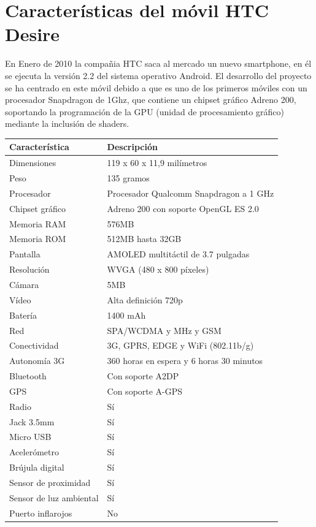 \section*{Características del móvil HTC Desire}
En Enero de 2010 la compañia HTC saca al mercado un nuevo smartphone, en él se ejecuta la versión 2.2 del sistema operativo Android. El desarrollo del proyecto se ha centrado en este móvil debido a que es uno de los primeros móviles con un procesador Snapdragon de 1Ghz, que contiene un chipset gráfico Adreno 200, soportando la programación de la GPU (unidad de procesamiento gráfico) mediante la inclusión de shaders.
\newline 

\begin{center}
\begin{tabular}{|l|l|}
\hline
\rowcolor[gray]{.8}Característica & Descripción \\\hline
\hline
Dimensiones  			& 119 x 60 x 11,9 milímetros						\\\hline
Peso				 	& 135 gramos 								 	\\\hline
Procesador			& Procesador Qualcomm Snapdragon a 1 GHz			\\\hline
Chipset gráfico			& Adreno 200 con soporte OpenGL ES 2.0				\\\hline
Memoria RAM	 		& 576MB 										\\\hline
Memoria ROM  			& 512MB	hasta 32GB							\\\hline
Pantalla		 		& AMOLED multitáctil de 3.7 pulgadas					\\\hline
Resolución	 			& WVGA (480 x 800 píxeles)						\\\hline
Cámara			 	& 5MB										\\\hline
Vídeo				& Alta definición 720p								\\\hline
Batería			 	& 1400 mAh 									\\\hline
Red					& SPA/WCDMA y MHz y GSM						\\\hline
Conectividad			& 3G, GPRS, EDGE y WiFi (802.11b/g)					\\\hline
Autonomía	3G 			& 360 horas en espera y 6 horas 30 minutos  			\\\hline
Bluetooth				& Con soporte A2DP								\\\hline
GPS 					& Con soporte A-GPS								\\\hline
Radio				& Sí											\\\hline
Jack 3.5mm			& Sí											\\\hline
Micro USB				& Sí											\\\hline
Acelerómetro			& Sí											\\\hline
Brújula digital 			& Sí											\\\hline
Sensor de proximidad 	& Sí											\\\hline
Sensor de luz ambiental 	& Sí											\\\hline
Puerto inflarojos			& No											\\\hline
\end{tabular}
\end{center}


